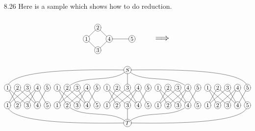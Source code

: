\begin{itemize}
	\item[8.26]
	Here is a sample which shows how to do reduction.
	\begin{gather*}
		\xymatrix@ur@R=1pc@C=1pc{
			*+[o][F-]{1} \ar@{-}[d] \ar@{-}[r] & *+[o][F-]{2} & \\
			*+[o][F-]{3} & *+[o][F-]{4} \ar@{-}[u] \ar@{-}[l] \ar@{-}[rd] & \\
			& & *+[o][F-]{5}
		}
		\scalebox{1.5}{$\qquad \implies$} \\
		\xymatrix@R=1.5pc@C=0.5pc{
			&&&&&&&&&&&& 
			*+[o][F-]{S} 
			\ar@{-}@(l,u)[dllllllllllll]
			\ar@{-}@(ld,ur)[dllllll]
			\ar@{-}[d]
			\ar@{-}@(rd,ul)[drrrrrr]
			\ar@{-}@(r,u)[drrrrrrrrrrrr]
			&&&&&&&&&&&& \\
			*+[o][F-]{1} \ar@{-}[rd] \ar@{-}[rrd] & *+[o][F-]{2} \ar@{-}[dl] \ar@{-}[drr] & *+[o][F-]{3} \ar@{-}[dll] \ar@{-}[dr] & *+[o][F-]{4} \ar@{-}[dl] \ar@{-}[dll] \ar@{-}[dr] & *+[o][F-]{5} \ar@{-}[dl] &
			*+[o][F-]{1} \ar@{-}[rd] \ar@{-}[rrd] & *+[o][F-]{2} \ar@{-}[dl] \ar@{-}[drr] & *+[o][F-]{3} \ar@{-}[dll] \ar@{-}[dr] & *+[o][F-]{4} \ar@{-}[dl] \ar@{-}[dll] \ar@{-}[dr] & *+[o][F-]{5} \ar@{-}[dl] &
			*+[o][F-]{1} \ar@{-}[rd] \ar@{-}[rrd] & *+[o][F-]{2} \ar@{-}[dl] \ar@{-}[drr] & *+[o][F-]{3} \ar@{-}[dll] \ar@{-}[dr] & *+[o][F-]{4} \ar@{-}[dl] \ar@{-}[dll] \ar@{-}[dr] & *+[o][F-]{5} \ar@{-}[dl] &
			*+[o][F-]{1} \ar@{-}[rd] \ar@{-}[rrd] & *+[o][F-]{2} \ar@{-}[dl] \ar@{-}[drr] & *+[o][F-]{3} \ar@{-}[dll] \ar@{-}[dr] & *+[o][F-]{4} \ar@{-}[dl] \ar@{-}[dll] \ar@{-}[dr] & *+[o][F-]{5} \ar@{-}[dl] &
			*+[o][F-]{1} \ar@{-}[rd] \ar@{-}[rrd] & *+[o][F-]{2} \ar@{-}[dl] \ar@{-}[drr] & *+[o][F-]{3} \ar@{-}[dll] \ar@{-}[dr] & *+[o][F-]{4} \ar@{-}[dl] \ar@{-}[dll] \ar@{-}[dr] & *+[o][F-]{5} \ar@{-}[dl] \\
			*+[o][F-]{1} & *+[o][F-]{2} & *+[o][F-]{3} & *+[o][F-]{4} & *+[o][F-]{5} &
			*+[o][F-]{1} & *+[o][F-]{2} & *+[o][F-]{3} & *+[o][F-]{4} & *+[o][F-]{5} &
			*+[o][F-]{1} & *+[o][F-]{2} & *+[o][F-]{3} & *+[o][F-]{4} & *+[o][F-]{5} &
			*+[o][F-]{1} & *+[o][F-]{2} & *+[o][F-]{3} & *+[o][F-]{4} & *+[o][F-]{5} &
			*+[o][F-]{1} & *+[o][F-]{2} & *+[o][F-]{3} & *+[o][F-]{4} & *+[o][F-]{5} \\
			&&&&&&&&&&&& 
			*+[o][F-]{T} 
			\ar@{-}@(l,d)[ullllllllllll]
			\ar@{-}@(lu,dr)[ullllll]
			\ar@{-}[u]
			\ar@{-}@(ru,dl)[urrrrrr]
			\ar@{-}@(r,d)[urrrrrrrrrrrr]
			&&&&&&&&&&&&
		}
	\end{gather*}
	

\end{itemize}
